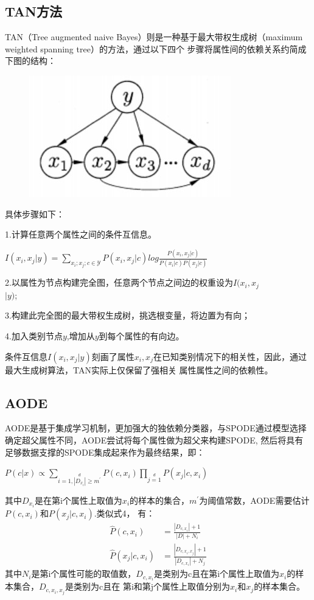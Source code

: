 \documentclass[UTF8]{ctexart}
\begin{document}
{\subsection{TAN方法}
TAN（Tree augmented naive Bayes）则是一种基于最大带权生成树（maximum weighted spanning tree）的方法，通过以下四个
步骤将属性间的依赖关系约简成下图的结构：
\begin{figure}[ht]
\centering
\includegraphics[scale=0.6]{05.jpg}    
\end{figure}
具体步骤如下：\par
1.计算任意两个属性之间的条件互信息。
\begin{center}
    $I(x_i,x_j|y)=\sum\limits_{x_i;x_j;c\in \mathcal Y}P(x_i,x_j|c)log\frac{P(x_i,x_j|c)}{P(x_i|c)P(x_j|c)}$
\end{center}\par
2.以属性为节点构建完全图，任意两个节点之间边的权重设为$I(x_i,x_j$\\$|y)$;\par
3.构建此完全图的最大带权生成树，挑选根变量，将边置为有向；\par
4.加入类别节点$y$,增加从$y$到每个属性的有向边。\par
条件互信息$I(x_i,x_j|y)$刻画了属性$x_i,x_j$在已知类别情况下的相关性，因此，通过最大生成树算法，TAN实际上仅保留了强相关
属性属性之间的依赖性。
\subsection{AODE}
AODE是基于集成学习机制，更加强大的独依赖分类器，与SPODE通过模型选择确定超父属性不同，AODE尝试将每个属性做为超父来构建SPODE,
然后将具有足够数据支撑的SPODE集成起来作为最终结果，即：
\begin{center}
    $P(c|x)\propto\sum\limits_{i=1,|D_{x_i}|\geq m^{'}}\limits^dP(c,x_i)\prod\limits_{j=1}\limits^dP(x_j|c,x_i)$
\end{center}
其中$D_{x_i}$是在第i个属性上取值为$x_i$的样本的集合，$m^{'}$为阈值常数，AODE需要估计$P(c,x_i)$和$P(x_j|c,x_i)$.类似式4，
有：
\begin{align*}
    \hat{P}(c,x_i)&=\frac{|D_{c,x_i}|+1}{|D|+N_i}\\[2ex]
    \hat{P}(x_j|c,x_i)&=\frac{|D_{c,x_i,x_j}|+1}{|D_{c,x_i}|+N_j}
\end{align*}
其中$N_i$是第i个属性可能的取值数，$D_{c,x_i}$是类别为c且在第i个属性上取值为$x_i$的样本集合，$D_{c,x_i,x_j}$是类别为c且在
第i和第j个属性上取值分别为$x_i$和$x_j$的样本集合。
}
\end{document}
